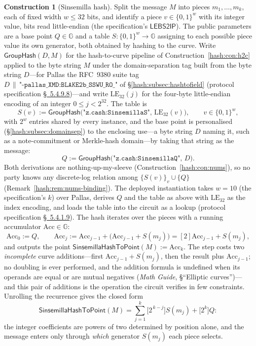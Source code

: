 \documentclass[11pt,a4paper]{article}
\theoremstyle{definition}
\newtheorem{construction}[theorem]{Construction}
\theoremstyle{remark}
\newcommand{\G}{\ensuremath{\mathbb{G}}}
\begin{document}
\begin{construction}[Sinsemilla hash]
\label{commitments:def:sinsemilla-hash}
Split the message \(M\) into pieces \(m_1, \dots, m_k\), each of
fixed width \(w \le 32\) bits, and identify a piece
\(v \in \{0,1\}^{w}\) with its integer value, bits read
little-endian (the specification's \(\mathsf{LEBS2IP}\)). The public
parameters are a base point \(Q \in \G\) and a table
\(S \colon \{0,1\}^{w} \to \G\) assigning to each possible piece
value its own generator, both obtained by hashing to the curve.
Write \(\mathsf{GroupHash}(D, M)\) for the hash-to-curve pipeline of
Construction~\ref{hash:con:h2c} applied to the byte string \(M\)
under the domain-separation tag built from the byte string
\(D\)---for Pallas the RFC~9380 suite tag
\(D \,\|\, \texttt{"-pallas\_XMD:BLAKE2b\_SSWU\_RO\_"}\) of
\S\ref{hash:subsec:hashtofield} (protocol specification
\href{https://zips.z.cash/protocol/protocol.pdf\#concretegrouphashpallasandvesta}{\S~5.4.9.8})---and
write \(\mathrm{LE}_{32}(j)\) for the four-byte
little-endian encoding of an integer \(0 \le j < 2^{32}\). The table
is
\[
S(v) := \mathsf{GroupHash}\bigl(\texttt{"z.cash:SinsemillaS"},\,
  \mathrm{LE}_{32}(v)\bigr), \qquad v \in \{0,1\}^{w},
\]
with \(2^{w}\) entries shared by every instance, and the base point
is personalised (\S\ref{hash:subsec:domainsep}) to the enclosing
use---a byte string \(D\) naming it, such as a note-commitment or
Merkle-hash domain---by taking that string as the message:
\[
Q := \mathsf{GroupHash}\bigl(\texttt{"z.cash:SinsemillaQ"},\, D\bigr).
\]
Both derivations are nothing-up-my-sleeve
(Construction~\ref{hash:con:nums}), so no party knows any
discrete-log relation among \(\{S(v)\}_v \cup \{Q\}\)
(Remark~\ref{hash:rem:nums-binding}). The deployed instantiation
takes \(w = 10\) (the specification's \(k\)) over Pallas, derives \(Q\)
and the table as above with \(\mathrm{LE}_{32}\) as the index encoding,
and loads the table into the circuit as a lookup (protocol specification
\href{https://zips.z.cash/protocol/protocol.pdf\#concretesinsemillahash}{\S~5.4.1.9}).
The hash iterates over the pieces with a running accumulator
\(\mathrm{Acc} \in \G\):
\[
\mathrm{Acc}_0 := Q, \qquad
\mathrm{Acc}_j := \mathrm{Acc}_{j-1}
  + \bigl(\mathrm{Acc}_{j-1} + S(m_j)\bigr)
  = [2]\mathrm{Acc}_{j-1} + S(m_j),
\]
and outputs the point
\(\mathsf{SinsemillaHashToPoint}(M) := \mathrm{Acc}_k\). The
step costs two \emph{incomplete} curve additions---first
\(\mathrm{Acc}_{j-1} + S(m_j)\), then the result plus
\(\mathrm{Acc}_{j-1}\); no doubling is ever performed, and the
addition formula is undefined when its operands are equal or are
mutual negatives (\emph{Math Guide}, \S``Elliptic
curves'')---and this pair of additions is the operation the
circuit verifies in few constraints. Unrolling the recurrence gives
the closed form
\[
\mathsf{SinsemillaHashToPoint}(M)
= \sum_{j=1}^{k} \bigl[2^{\,k-j}\bigr] S(m_j) + \bigl[2^{k}\bigr] Q :
\]
the integer coefficients are powers of two determined by position
alone, and the message enters only through \emph{which} generator
\(S(m_j)\) each piece selects.
\end{construction}
\end{document}
